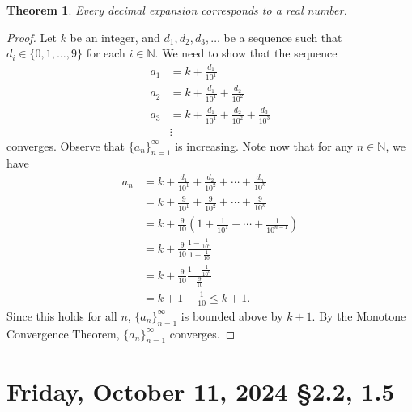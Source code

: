 \documentclass[12pt]{amsart}
\def\Fr{Friday}
\newcommand{\N}{\mathbb{N}}
\numberwithin{equation}{section}
\theoremstyle{plain} %
\newtheorem{thm}[equation]{Theorem}
\newcommand{\Oct}[3]{\section{#2, October #1, 2024 \quad \S#3}}
\theoremstyle{definition}
\theoremstyle{remark}
\begin{document}
\begin{thm}
Every decimal expansion corresponds to a real number.
\end{thm}
\begin{proof}
Let $k$ be an integer, and $d_1,d_2,d_3,\dots$ be a sequence such that $d_i\in \{0,1,\dots,9\}$ for each $i\in \N$. We need to show that the sequence 
\begin{align*}
a_1 &= k + \frac{d_1}{10^1} \\
a_2 &= k + \frac{d_1}{10^1} + \frac{d_2}{10^2} \\
a_3 &= k + \frac{d_1}{10^1} + \frac{d_2}{10^2} + \frac{d_3}{10^3}\\
&\vdots
\end{align*}
converges. Observe that $\{a_n\}_{n=1}^\infty$ is increasing. Note now that for any $n\in \N$, we have
\begin{align*}
a_n &=k + \frac{d_1}{10^1} + \frac{d_2}{10^2} + \cdots + \frac{d_n}{10^n}\\
&=k + \frac{9}{10^1} + \frac{9}{10^2} + \cdots + \frac{9}{10^n}\\
&=k + \frac{9}{10} \left( 1 + \frac{1}{10^1} + \cdots + \frac{1}{10^{n-1}} \right) \\
&= k+ \frac{9}{10} \frac{ 1 - \frac{1}{10^n} }{1- \frac{1}{10}}\\
&= k+ \frac{9}{10} \frac{ 1 - \frac{1}{10^n} }{\frac{9}{10}}\\
&= k+ 1-\frac{1}{10} \leq k+1.\end{align*}
Since this holds for all $n$, $\{a_n\}_{n=1}^\infty$ is bounded above by $k+1$. By the Monotone Convergence Theorem, $\{a_n\}_{n=1}^\infty$ converges.
\end{proof}

\setcounter{section}{18}


\Oct{11}{\Fr}{2.2, 1.5}
\end{document}

